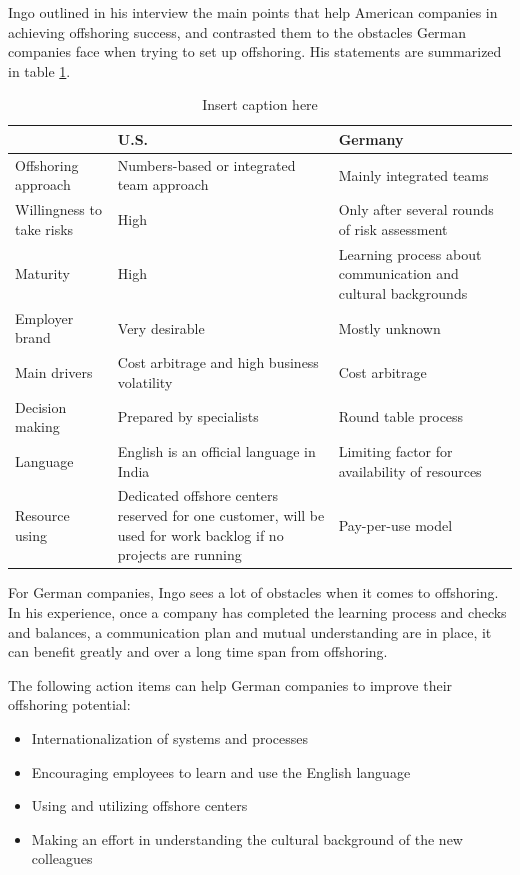 Ingo outlined in his interview the main points that help American companies in achieving offshoring success, and contrasted them to the obstacles German companies face when trying to set up offshoring. His statements are summarized in table \ref{tab:IngoComparison}.

\vspace{3mm}
\begin{table}[htb]
	\centering
	\begin{tabular}{l|p{5.2cm}|p{5.2cm}}
		& \textbf{U.S.} & \textbf{Germany}\\\hline
		\rule{0pt}{3ex}Offshoring approach&Numbers-based or integrated team approach &Mainly integrated teams \\ \hline
		\rule{0pt}{3ex}Willingness to take risks& High & Only after several rounds of risk assessment \\ \hline
		\rule{0pt}{3ex}Maturity &High & Learning process about communication and cultural backgrounds \\ \hline
		\rule{0pt}{3ex}Employer brand&Very desirable &Mostly unknown \\ \hline
		\rule{0pt}{3ex}Main drivers&Cost arbitrage and high business volatility &Cost arbitrage \\ \hline
		\rule{0pt}{3ex}Decision making &Prepared by specialists & Round table process \\ \hline
		\rule{0pt}{3ex}Language &English is an official language in India & Limiting factor for availability of resources \\ \hline
		\rule{0pt}{3ex}Resource using &Dedicated offshore centers reserved for one customer, will be used for work backlog if no projects are running& Pay-per-use model\\ \hline
	\end{tabular}
	\vspace{3mm}
	\caption{Insert caption here}%
	\label{tab:IngoComparison}
\end{table}

For German companies, Ingo sees a lot of obstacles when it comes to offshoring. In his experience, once a company has completed the learning process and checks and balances, a communication plan and mutual understanding are in place, it can benefit greatly and over a long time span from offshoring.

The following action items can help German companies to improve their offshoring potential:
\begin{itemize}
	\item Internationalization of systems and processes
	\item Encouraging employees to learn and use the English language
	\item Using and utilizing offshore centers
	\item Making an effort in understanding the cultural background of the new colleagues
\end{itemize}

